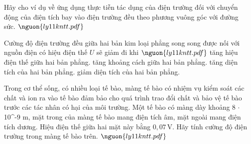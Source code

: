 

\begin{ex}
Hãy cho ví dụ về ứng dụng thực tiễn tác dụng của điện trường đối với chuyển động của điện tích bay vào điện trường đều theo phương vuông góc với đường sức. $\nguon{ly11 kntt.pdf}$
\choiceTF

\end{ex}

\begin{ex}
Cường độ điện trường đều giữa hai bản kim loại phẳng song song được nối với nguồn điện có hiệu điện thế $U$ sẽ giảm đi khi $\nguon{ly11 kntt.pdf}$
\choice
{tăng hiệu điện thế giữa hai bản phẳng.}
{\True tăng khoảng cách giữa hai bản phẳng.}
{tăng diện tích của hai bản phẳng.}
{giảm diện tích của hai bản phẳng.}
\end{ex}

\begin{ex}
Trong cơ thể sống, có nhiều loại tế bào, màng tế bào có nhiệm vụ kiểm soát các chất và ion ra vào tế bào đảm bảo cho quá trình trao đổi chất và bảo vệ tế bào trước các tác nhân có hại của môi trường. Một tế bào có màng dày khoảng 8 $\cdot$ 10^{-9} m, mặt trong của màng tế bào mang điện tích âm, mặt ngoài mang điện tích dương. Hiệu điện thế giữa hai mặt này bằng $0,07\,\mathrm{V}$. Hãy tính cường độ điện trường trong màng tế bào trên. $\nguon{ly11 kntt.pdf}$
\choiceTF

\end{ex}

